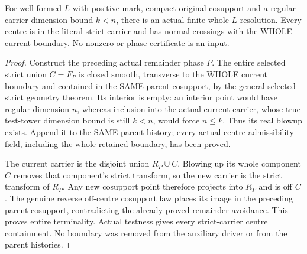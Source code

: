 \begin{theorem}
\label{hir:boundary-coefficient-positive-codimension-resolution}
\leanok
For well-formed $L$ with positive mark, compact original cosupport and a
regular carrier dimension bound $k<n$, there is an actual finite whole
$L$-resolution. Every centre is in the literal strict carrier and has normal
crossings with the WHOLE current boundary. No nonzero or phase certificate
is an input.
\end{theorem}
\begin{proof}
Construct the preceding actual remainder phase $P$. The entire selected
strict union $C=F_P$ is closed smooth, transverse to the WHOLE current boundary
and contained in the SAME parent cosupport, by the general selected-strict
geometry theorem. Its interior is empty: an interior point would have regular
dimension $n$, whereas inclusion into the actual current carrier, whose
true test-tower dimension bound is still $k<n$, would force $n\le k$.
Thus its real blowup exists. Append it to the SAME parent history; every
actual centre-admissibility field, including the whole retained boundary,
has been proved.

The current carrier is the disjoint union $R_P\cup C$. Blowing up its whole
component $C$ removes that component's strict transform, so the new carrier
is the strict transform of $R_P$. Any new cosupport point therefore projects
into $R_P$ and is off $C$. The genuine reverse off-centre cosupport law
places its image in the preceding parent cosupport, contradicting the
already proved remainder avoidance. This proves entire terminality.
Actual testness gives every strict-carrier centre containment. No boundary
was removed from the auxiliary driver or from the parent histories.
\end{proof}

